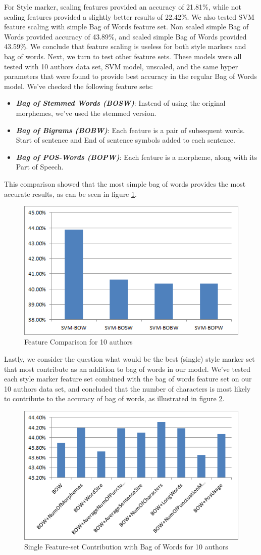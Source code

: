 \documentclass[a4paper]{article}
\begin{document}
For Style marker, scaling features provided an accuracy of 21.81\%, while not scaling features provided a slightly better results of 22.42\%.
We also tested SVM feature scaling with simple Bag of Words feature set.
Non scaled simple Bag of Words provided accuracy of 43.89\%, and scaled simple Bag of Words provided 43.59\%.
We conclude that feature scaling is useless for both style markers and bag of words.
Next, we turn to test other feature sets. These models were all tested with 10 authors data set, SVM model, unscaled, and the same hyper parameters that were found to provide best accuracy in the regular Bag of Words model. We've checked the following feature sets:
\begin{itemize}
\item \textbf{\emph{Bag of Stemmed Words (BOSW)}}: Instead of using the original morphemes, we've used the stemmed version.
\item \textbf{\emph{Bag of Bigrams (BOBW)}}: Each feature is a pair of subsequent words. Start of sentence and End of sentence symbols added to each sentence.
\item \textbf{\emph{Bag of POS-Words (BOPW)}}: Each feature is a morpheme, along with its Part of Speech.
\end{itemize}
This comparison showed that the most simple bag of words provides the most accurate results, as can be seen in figure \ref{fig:feature comparison}.
\begin{figure}[!h]
	\centering
	\includegraphics[width=.5\textwidth]{"figures/feature_comparison"}
	\caption{Feature Comparison for 10 authors}
	\label{fig:feature comparison}
\end{figure}
Lastly, we consider the question what would be the best (single) style marker set that most contribute as an addition to bag of words in our model.
We've tested each style marker feature set combined with the bag of words feature set on our 10 authors data set, and concluded that the number of characters is most likely to contribute to the accuracy of bag of words, as illustrated in figure \ref{fig:contribute}.
\begin{figure}[!h]
	\centering
	\includegraphics[width=.5\textwidth]{"figures/contribute"}
	\caption{Single Feature-set Contribution with Bag of Words for 10 authors}
	\label{fig:contribute}
\end{figure}
\end{document}
